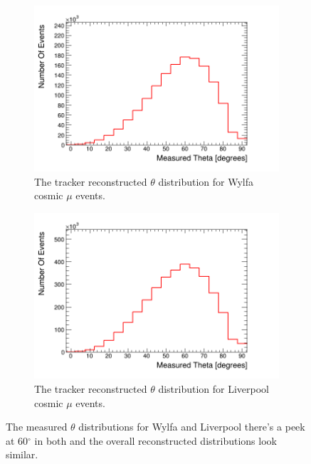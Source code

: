 \begin{figure}[!h]
\centering
\begin{subfigure}{.5\textwidth}
  \centering
  \includegraphics[width=\linewidth]{Chapter5/Figs/UsingSimulatedDataAsControl/measuredThetaWylfa.png}
  \captionsetup{width=.9\linewidth}
  \caption{The tracker reconstructed $\theta$ distribution for Wylfa cosmic $\mu$ events.}
  \label{subFig:measuredThetaWylfa}
\end{subfigure}%
\begin{subfigure}{.5\textwidth}
  \centering
\includegraphics[width=\linewidth]{Chapter5/Figs/UsingSimulatedDataAsControl/measuredThetaLiverpool.png}
  \captionsetup{width=.9\linewidth}
  \caption{The tracker reconstructed $\theta$ distribution for Liverpool cosmic $\mu$ events.}
  \label{subFig:measuredThetaLiverpool}
\end{subfigure}
\caption{The measured $\theta$ distributions for Wylfa and Liverpool there's a peek at 60$^\circ$ in both and the overall reconstructed distributions look similar.}
\label{fig:measuredThetaWylfaLiverpool}
\end{figure}

